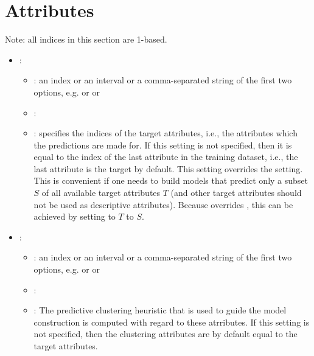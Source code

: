 \section{Attributes}
Note: all indices in this section are 1-based.

\begin{itemize}
    \item {}:
           \begin{itemize}
                \item \optionPossibleValues{}: an index or an interval or a comma-separated string of the first two options, e.g.  or  or 
                \item \optionDefaultValue{}: 
                \item \optionDescrption{}: specifies the indices of the target attributes, i.e., the attributes which the predictions are made for.
                If this setting is not specified, then it is equal to the index of the last attribute in the training dataset, i.e., the last attribute is the target by default.
                 This setting overrides the  setting. This is convenient if one needs to build models that predict only a subset $S$ of all available target attributes $T$
                 (and other target attributes should not be used as descriptive attributes). Because  overrides , this can be achieved
                 by setting  to $T$  to $S$. 
           \end{itemize}
    \item {}:
           \begin{itemize}
                \item \optionPossibleValues{}: an index or an interval or a comma-separated string of the first two options, e.g.  or  or 
                \item \optionDefaultValue{}: 
                \item \optionDescrption{}: The predictive clustering heuristic that is used to guide the model construction is computed with regard to these atrributes. If this setting is not specified, then the clustering attributes are by default equal to the target attributes.
           \end{itemize}

\end{itemize}
